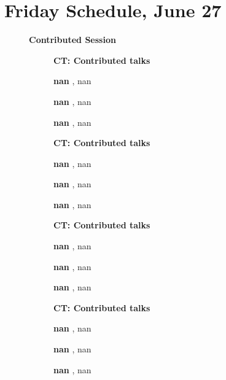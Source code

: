 \documentclass[ILAS2025-program.tex]{subfiles}
\begin{document}
\section{Friday Schedule, June 27}
    
    \begin{description}
    \item[] \textbf{Contributed Session} 
    \begin{description}
    \item[] {\color{mstitle}\textbf{CT: Contributed talks}} 
    \item[] \textbf{nan} , nan
        \item[] \textbf{nan} , nan
        \item[] \textbf{nan} , nan
        \end{description}
    \begin{description}
    \item[] {\color{mstitle}\textbf{CT: Contributed talks}} 
    \item[] \textbf{nan} , nan
        \item[] \textbf{nan} , nan
        \item[] \textbf{nan} , nan
        \end{description}
    \begin{description}
    \item[] {\color{mstitle}\textbf{CT: Contributed talks}} 
    \item[] \textbf{nan} , nan
        \item[] \textbf{nan} , nan
        \item[] \textbf{nan} , nan
        \end{description}
    \begin{description}
    \item[] {\color{mstitle}\textbf{CT: Contributed talks}} 
    \item[] \textbf{nan} , nan
        \item[] \textbf{nan} , nan
        \item[] \textbf{nan} , nan
        \end{description}

\end{description}
\end{document}
